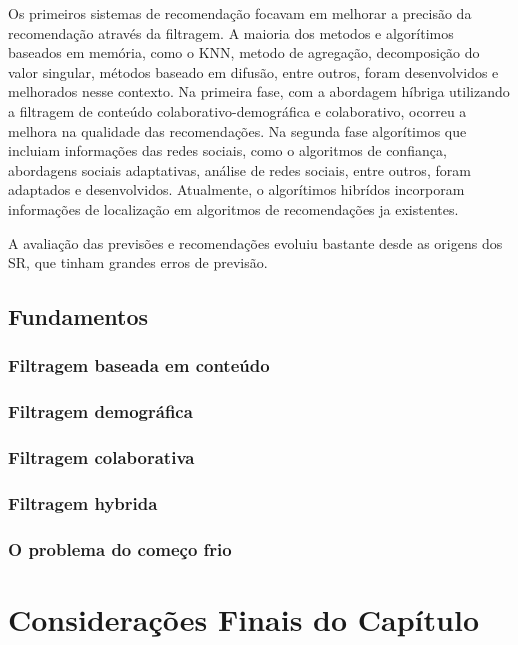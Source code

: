 Os primeiros sistemas de recomendação focavam em melhorar a precisão da recomendação através da filtragem. A maioria dos metodos e algorítimos baseados em memória, como o KNN, metodo de agregação, decomposição do valor singular, métodos baseado em difusão, entre outros, foram desenvolvidos e melhorados nesse contexto. Na primeira fase, com a abordagem híbriga utilizando a filtragem de conteúdo colaborativo-demográfica e colaborativo, ocorreu a melhora na qualidade das recomendações. Na segunda fase algorítimos que incluiam informações das redes sociais, como o algoritmos de confiança, abordagens sociais adaptativas, análise de redes sociais, entre outros, foram adaptados e desenvolvidos. Atualmente, o algorítimos hibrídos incorporam informações de localização em algoritmos de recomendações ja existentes. 

A avaliação das previsões e recomendações evoluiu bastante desde as origens dos SR, que tinham grandes erros de previsão.


\subsection{Fundamentos}

\subsubsection{Filtragem baseada em conteúdo}

\subsubsection{Filtragem demográfica}

\subsubsection{Filtragem colaborativa}

\subsubsection{Filtragem hybrida}

\subsubsection{O problema do começo frio}


\section{Considerações Finais do Capítulo}


